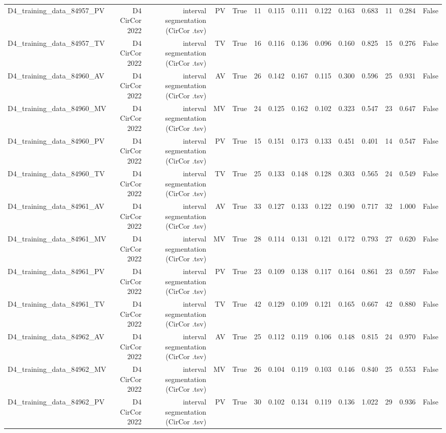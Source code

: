 \begin{table}[htbp]
\begin{tabular}{lrrrrrrrrrrrrr}
    D4\_training\_data\_84957\_PV & D4 CirCor 2022 & interval segmentation (CirCor .tsv) & PV & True & 11 & 0.115 & 0.111 & 0.122 & 0.163 & 0.683 & 11 & 0.284 & False \\
    D4\_training\_data\_84957\_TV & D4 CirCor 2022 & interval segmentation (CirCor .tsv) & TV & True & 16 & 0.116 & 0.136 & 0.096 & 0.160 & 0.825 & 15 & 0.276 & False \\
    D4\_training\_data\_84960\_AV & D4 CirCor 2022 & interval segmentation (CirCor .tsv) & AV & True & 26 & 0.142 & 0.167 & 0.115 & 0.300 & 0.596 & 25 & 0.931 & False \\
    D4\_training\_data\_84960\_MV & D4 CirCor 2022 & interval segmentation (CirCor .tsv) & MV & True & 24 & 0.125 & 0.162 & 0.102 & 0.323 & 0.547 & 23 & 0.647 & False \\
    D4\_training\_data\_84960\_PV & D4 CirCor 2022 & interval segmentation (CirCor .tsv) & PV & True & 15 & 0.151 & 0.173 & 0.133 & 0.451 & 0.401 & 14 & 0.547 & False \\
    D4\_training\_data\_84960\_TV & D4 CirCor 2022 & interval segmentation (CirCor .tsv) & TV & True & 25 & 0.133 & 0.148 & 0.128 & 0.303 & 0.565 & 24 & 0.549 & False \\
    D4\_training\_data\_84961\_AV & D4 CirCor 2022 & interval segmentation (CirCor .tsv) & AV & True & 33 & 0.127 & 0.133 & 0.122 & 0.190 & 0.717 & 32 & 1.000 & False \\
    D4\_training\_data\_84961\_MV & D4 CirCor 2022 & interval segmentation (CirCor .tsv) & MV & True & 28 & 0.114 & 0.131 & 0.121 & 0.172 & 0.793 & 27 & 0.620 & False \\
    D4\_training\_data\_84961\_PV & D4 CirCor 2022 & interval segmentation (CirCor .tsv) & PV & True & 23 & 0.109 & 0.138 & 0.117 & 0.164 & 0.861 & 23 & 0.597 & False \\
    D4\_training\_data\_84961\_TV & D4 CirCor 2022 & interval segmentation (CirCor .tsv) & TV & True & 42 & 0.129 & 0.109 & 0.121 & 0.165 & 0.667 & 42 & 0.880 & False \\
    D4\_training\_data\_84962\_AV & D4 CirCor 2022 & interval segmentation (CirCor .tsv) & AV & True & 25 & 0.112 & 0.119 & 0.106 & 0.148 & 0.815 & 24 & 0.970 & False \\
    D4\_training\_data\_84962\_MV & D4 CirCor 2022 & interval segmentation (CirCor .tsv) & MV & True & 26 & 0.104 & 0.119 & 0.103 & 0.146 & 0.840 & 25 & 0.553 & False \\
    D4\_training\_data\_84962\_PV & D4 CirCor 2022 & interval segmentation (CirCor .tsv) & PV & True & 30 & 0.102 & 0.134 & 0.119 & 0.136 & 1.022 & 29 & 0.936 & False \\

\end{tabular}
\end{table}

